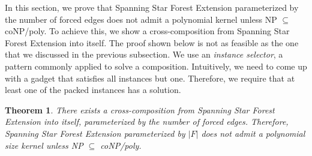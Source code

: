 \documentclass[en]{pracamgr}
\newtheorem{theorem}{Theorem}
\newcommand{\ssfep}{{\sc Spanning Star Forest Extension}}
\begin{document}
In this section, we prove that \ssfep{} parameterized by the number of forced edges does not admit a polynomial kernel unless NP $\subseteq$ coNP/poly. To achieve this, we show a cross-composition from \ssfep{} into itself. The proof shown below is not as feasible as the one that we discussed in the previous subsection. We use an \emph{instance selector}, a pattern commonly applied to solve a composition. Intuitively, we need to come up with a gadget that satisfies all instances but one. Therefore, we require that at least one of the packed instances has a solution.

\begin{theorem}
	There exists a cross-composition from \ssfep{} into itself, parameterized by the number of forced edges. Therefore, \ssfep{} parameterized by $|F|$ does not admit a polynomial size kernel unless \textup{NP $\subseteq$ coNP/poly}.
\end{theorem}
\end{document}
